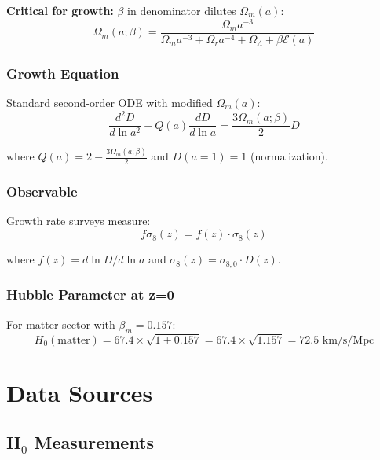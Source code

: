 \documentclass[11pt]{article}
\begin{document}
\textbf{Critical for growth:} $\beta$ in denominator dilutes $\Omega_m(a)$:
\begin{equation}
\Omega_m(a; \beta) = \frac{\Omega_m a^{-3}}{\Omega_m a^{-3} + \Omega_r a^{-4} + \Omega_\Lambda + \beta \mathcal{E}(a)}
\end{equation}

\subsubsection{Growth Equation}

Standard second-order ODE with modified $\Omega_m(a)$:
\begin{equation}
\frac{d^2 D}{d\ln a^2} + Q(a) \frac{dD}{d\ln a} = \frac{3\Omega_m(a; \beta)}{2} D
\end{equation}

where $Q(a) = 2 - \frac{3\Omega_m(a; \beta)}{2}$ and $D(a=1) = 1$ (normalization).

\subsubsection{Observable}

Growth rate surveys measure:
\begin{equation}
f\sigma_8(z) = f(z) \cdot \sigma_8(z)
\end{equation}

where $f(z) = d \ln D / d \ln a$ and $\sigma_8(z) = \sigma_{8,0} \cdot D(z)$.

\subsubsection{Hubble Parameter at z=0}

For matter sector with $\beta_m = 0.157$:
\begin{equation}
H_0(\text{matter}) = 67.4 \times \sqrt{1 + 0.157} = 67.4 \times \sqrt{1.157} = 72.5 \text{ km/s/Mpc}
\end{equation}

\section{Data Sources}

\subsection{H$_0$ Measurements}
\end{document}
